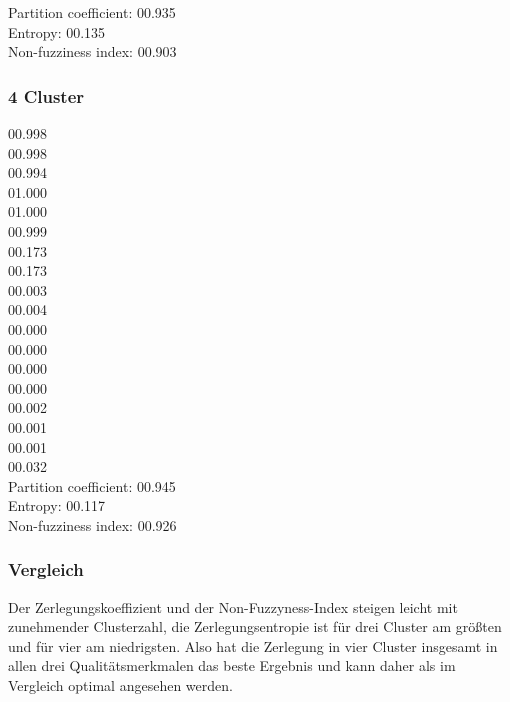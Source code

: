 Partition coefficient:	00.935\\
Entropy:		00.135\\
Non-fuzziness index:	00.903


\subsubsection*{4 Cluster}

00.998  \\
00.998  \\
00.994	\\
01.000	\\
01.000	\\
00.999	\\
00.173	\\
00.173	\\
00.003	\\
00.004	\\
00.000	\\
00.000	\\
00.000	\\
00.000	\\
00.002	\\
00.001	\\
00.001	\\
00.032	\\

Partition coefficient:	00.945\\
Entropy:		00.117\\
Non-fuzziness index:	00.926

\subsubsection*{Vergleich}

Der Zerlegungskoeffizient und der Non-Fuzzyness-Index steigen leicht mit zunehmender Clusterzahl, die Zerlegungsentropie ist für drei Cluster am größten und für vier am niedrigsten. Also hat die Zerlegung in vier Cluster insgesamt in allen drei Qualitätsmerkmalen das beste Ergebnis und kann daher als im Vergleich optimal angesehen werden.

